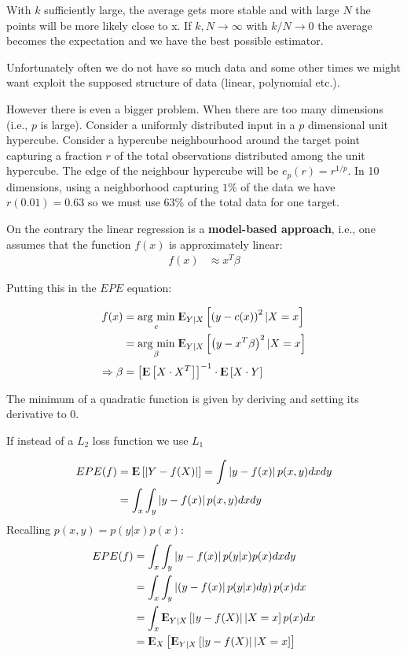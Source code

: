 \documentclass[12pt, letterpaper]{article}
\theoremstyle{definition}
\newcommand{\E}{{\rm I\kern-.3em E}}
\newcommand{\argmin}[1]{\underset{#1}{\operatorname{arg}\,\operatorname{min}}\;}
\begin{document}
With $k$ sufficiently large, the average gets more stable and with large $N$ the points will be more likely close to x. If $k, N \rightarrow \infty$ with $k/N \rightarrow 0$ the average becomes the expectation and we have the best possible estimator.

Unfortunately often we do not have so much data and some other times we might want exploit the supposed structure of data (linear, polynomial etc.).

However there is even a bigger problem. When there are too many dimensions (i.e., $p$ is large). Consider a uniformly distributed input in a $p$ dimensional unit hypercube. Consider a hypercube neighbourhood around the target point capturing a fraction $r$ of the total observations distributed among the unit hypercube. The edge of the neighbour hypercube will be $e_p(r) = r^{1/p}$. In 10 dimensions, using a neighborhood capturing $1\%$ of the data we have $r(0.01) = 0.63$ so we must use 63\% of the total data for one target.

On the contrary the linear regression is a \textbf{model-based approach}, i.e., one assumes that the function $f(x)$ is approximately linear:
\begin{align}
f(x) &\approx x^T \beta
\end{align}

Putting this in the $EPE$ equation:

\begin{align}
f(x) &= \argmin{c} \E_{Y|X} \left[ \left( y - c(x) \right)^2 | X=x \right]  \\
&= \argmin{\beta} \E_{Y|X} \left[ \left( y - x^T \beta \right)^2 | X=x \right] \\
\Rightarrow \beta &= \left[ \E\left[ X\cdot X ^T\right]\right]^{-1} \cdot \E\left[ X\cdot Y \right]
\end{align}

The minimum of a quadratic function is given by deriving and setting its derivative to $0$.

If instead of a $L_2$ loss function we use $L_1$

\begin{align}
EPE(f) &= \E\left[ \left| Y- f(X) \right| \right] = \int \left| y- f(x) \right| p(x,y) dx dy \\
&= \int_x\int_y \left| y- f(x) \right|p(x,y) dx dy \\
\end{align}
Recalling $p(x,y) = p( y|x) p(x)$:
\begin{align}
EPE(f) &= \int_x\int_y \left| y- f(x) \right|p(y|x)  p(x) dx dy \\
 &= \int_x \int_y \left| \left( y - f(x) \right| p(y|x) dy\right)  p(x) dx   \\
 &= \int_x \E_{Y|X} \left[ \left| y - f(X) \right| | X=x \right]  p(x) dx   \\
 &= \E_X \left[ \E_{Y|X} \left[ \left| y - f(X) \right| | X=x \right]    \right]   
\end{align}
\end{document}
